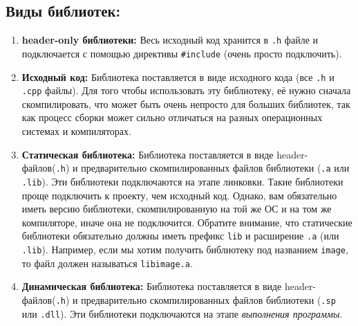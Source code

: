 \documentclass{article}
\begin{document}
\subsection*{Виды библиотек:}
\begin{enumerate}
\item \textbf{header-only библиотеки:} Весь исходный код хранится в \texttt{.h} файле и подключается с помощью директивы \texttt{\#include} (очень просто подключить).
\item \textbf{Исходный код:} Библиотека поставляется в виде исходного кода (все \texttt{.h} и \texttt{.cpp} файлы). Для того чтобы использовать эту библиотеку, её нужно сначала скомпилировать, что может быть очень непросто для больших библиотек, так как процесс сборки может сильно отличаться на разных операционных системах и компиляторах.
\item \textbf{Статическая библиотека:} Библиотека поставляется в виде header-файлов(\texttt{.h}) и предварительно скомпилированных файлов библиотеки (\texttt{.a} или \texttt{.lib}). Эти библиотеки подключаются на этапе линковки. Такие библиотеки проще подключить к проекту, чем исходный код. Однако, вам обязательно иметь версию библиотеки, скомпилированную на той же ОС и на том же компиляторе, иначе она не подключится. Обратите внимание, что статические библиотеки обязательно должны иметь префикс \texttt{lib} и расширение \texttt{.a} (или \texttt{.lib}). Например, если мы хотим получить библиотеку под названием \texttt{image}, то файл должен называться \texttt{libimage.a}.
\item \textbf{Динамическая библиотека:} Библиотека поставляется в виде header-файлов(\texttt{.h}) и предварительно скомпилированных файлов библиотеки (\texttt{.sp} или \texttt{.dll}). Эти библиотеки подключаются на этапе \textit{выполнения программы}.
\end{enumerate}
\end{document}
